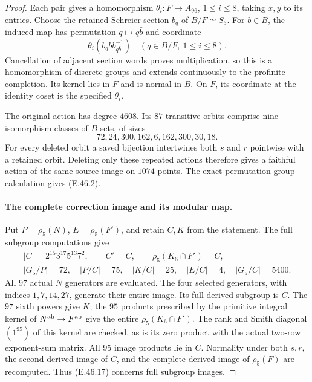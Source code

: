 \begin{proof}
Each pair gives a homomorphism $\theta_i:F\to A_{96}$,
$1\le i\le8$, taking $x,y$ to its entries.
Choose the retained Schreier section $b_q$ of $B/F\simeq S_3$.
For $b\in B$, the induced map has permutation $q\mapsto q\bar b$
and coordinate
\[
          \theta_i(b_q b b_{q\bar b}^{-1})
                   \quad(q\in B/F,\ 1\le i\le8).
 \tag{E.46.15}
\]
Cancellation of adjacent section words proves multiplication,
so this is a homomorphism of discrete groups and extends
continuously to the profinite completion.  Its kernel lies
in $F$ and is normal in $B$.  On $F$, its coordinate at the
identity coset is the specified $\theta_i$.

The original action has degree $4608$.  Its $87$ transitive
orbits comprise nine isomorphism classes of $B$-sets, of sizes
\[
                    72,24,300,162,6,162,300,30,18.
 \tag{E.46.16}
\]
For every deleted orbit a saved bijection intertwines both
$s$ and $r$ pointwise with a retained orbit.  Deleting only
these repeated actions therefore gives a faithful action
of the same source image on $1074$ points.  The exact
permutation-group calculation gives \textup{(E.46.2)}.

\paragraph{The complete correction image and its modular map.}
Put $P=\rho_5(N)$, $E=\rho_5(F')$, and retain $C,K$ from
the statement.  The full subgroup computations give
\[
 \begin{gathered}
 |C|=2^{15}3^{17}5^{13}7^2,\qquad C'=C,
               \qquad \rho_5(K_6\cap F')=C,\\
 |G_5/P|=72,\quad |P/C|=75,\quad |K/C|=25,
          \quad |E/C|=4,\quad |G_5/C|=5400.
 \end{gathered}
 \tag{E.46.17}
\]
All $97$ actual $N$ generators are evaluated.  The four
selected generators, with indices $1,7,14,27$, generate
their entire image.  Its full derived subgroup is $C$.
The $97$ sixth powers give $K$; the $95$ products prescribed
by the primitive integral kernel of
$N^{\rm ab}\to F^{\rm ab}$ give the entire
$\rho_5(K_6\cap F')$.  The rank and Smith diagonal
$(1^{95})$ of this kernel are checked, as is its zero
product with the actual two-row exponent-sum matrix.
All $95$ image products lie in $C$.
Normality under both $s,r$, the second derived image of $C$,
and the complete derived image of $\rho_5(F)$ are recomputed.
Thus \textup{(E.46.17)} concerns full subgroup images.


\end{proof}
